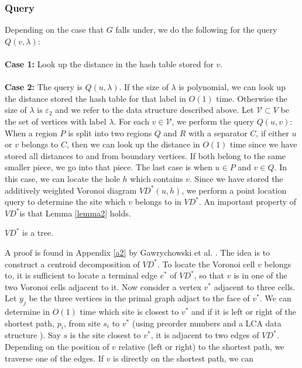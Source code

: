 \subsubsection{Query}
Depending on the case that $G$ falls under, we do the following for the
query $Q(v, \lambda)$: \\
\\
\textbf{Case 1:} Look up the distance in the hash table stored for $v$. \\
\\
\textbf{Case 2:} The query is $Q(u,\lambda)$. If the size of $\lambda$ is polynomial,
we can look up the distance stored the hash table for that label in $O(1)$ time.
Otherwise the size of $\lambda$ is $\varepsilon_2$ and we refer to the data structure
described above. Let $\mathcal{V}\subset V$ be the set of vertices with label $\lambda$.
For each $v\in \mathcal{V}$, we perform the query $Q(u,v)$:\\
When a region $P$ is split into two regions $Q$ and $R$ with a separator $C$, if
either $u$ or $v$ belongs to $C$, then we can look up the distance in $O(1)$ time since
we have stored all distances to and from boundary vertices. If both belong to the same
smaller piece, we go into that piece. The last case is when $u\in P$ and $v\in Q$. In this
case, we can locate the hole $h$ which contains $v$. Since we have stored the
additively weighted Voronoi diagram $VD^*(u,h)$, we perform a point location query to
determine the site which $v$ belongs to in $VD^*$. An important property of $VD^*$is that Lemma
\ref{lemma2} holds.
\begin{lemma}\label{lemma2}
  $VD^*$ is a tree.
\end{lemma}
A proof is found in Appendix \ref{a2} by Gawrychowski et al.
\cite{gawrychowski2017better}. The idea is to construct a centroid decomposition of $VD^*$. To locate the
Voronoi cell $v$ belongs to, it is sufficient to locate a terminal edge $e^*$ of $VD^*$, so that
$v$ is in one of the two Voronoi cells adjacent to it. Now consider a vertex $v^*$
adjacent to three cells. Let $y_j$ be the three vertices in the primal graph adjact to
the face of $v^*$. We can determine in $O(1)$ time which site is closest to $v^*$ and if it is
left or right of the shortest path, $p_i$, from site $s_i$ to $v^*$ (using preorder
numbers and a LCA data structure \cite{bender2000lca}). Say $s$ is the site closest to $v^*$, it is adjacent to two edges of
$VD^*$. Depending on the position of $v$ relative (left or right) to the shortest path,
we traverse one of the edges. If $v$ is directly on the shortest path, we can
